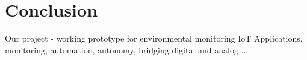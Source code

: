 \section{Conclusion}
Our project - working prototype for environmental monitoring 
IoT Applications, monitoring, automation, autonomy, bridging digital and analog
...
